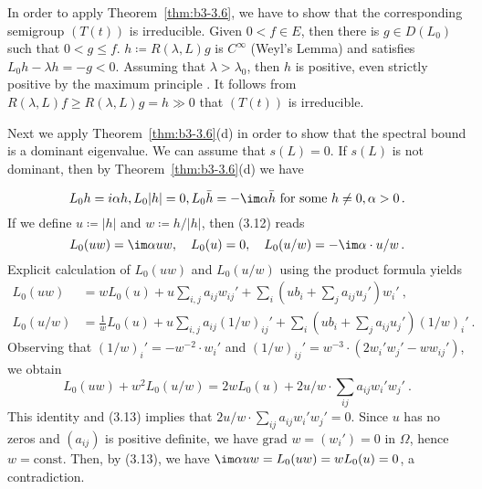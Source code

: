 \begin{examples}
\begin{enumerate}[(a), wide]
	In order to apply Theorem~\ref{thm:b3-3.6}, we have to show that the corresponding semigroup $(T(t))$ is irreducible.
	Given $0 < f \in E$, then there is $g \in D(L_{0})$ such that $0 < g \leq f$.
	$h \coloneq R(\lambda,L)g$ is $C^{\infty}$ (Weyl's Lemma) and satisfies $L_{0}h - \lambda h = -g < 0$.
	Assuming that $\lambda > \lambda_{0}$, then $h$ is positive, even strictly positive by the maximum principle \citet[Chap.2, Theorem~6]{protterweinberger:1967}.
	It follows from $R(\lambda,L)f \geq R(\lambda,L)g = h \gg 0$ that $(T(t))$ is irreducible.
	
	Next we apply Theorem~\ref{thm:b3-3.6}(d) in order to show that the spectral bound is a dominant eigenvalue.
	We can assume that $s(L) = 0$.
	If $s(L)$ is not dominant, then by Theorem~\ref{thm:b3-3.6}(d) we have
	
	\begin{equation}\label{eq:b3-3.12}
		L_0h = i \alpha h, L_0|h| = 0, L_0\bar{h} = -\im\alpha \bar{h} 
		\text{ for some } h \ne 0, \alpha > 0\,.
	\end{equation}
%
%
	If we define $u \coloneq |h|$ and $w \coloneq h/|h|$, then (3.12) reads
	 \begin{equation}\label{eq:b3-3.13}
	L_{0}(uw) = \im\alpha uw, \quad L_{0}(u) = 0, \quad L_{0}(u/w) = -\im\alpha\cdot u/w \,.
	\end{equation}
	Explicit calculation of $L_{0}(uw)$ and $L_{0}(u/w)$ using the product formula yields
		\begin{equation}\label{eq:b3-3.14}
		\begin{split}
		L_{0}(uw) &=  wL_{0}(u) + u\sum_{i,j} a_{ij}w_{ij}' + \sum_{i}\left(ub_{i} + \sum_{j} a_{ij}u_{j}'\right)w_{i}'~,\\
		L_{0}(u/w) &= \frac{1}{w}L_{0}(u) + u\sum_{i,j}a_{ij}(1/w)_{ij}' + \sum_{i}\left(ub_{i} + \sum_{j} a_{ij}u_{j}'\right)(1/w)_{i}'~.
		\end{split}
	\end{equation}
	Observing that $(1/w)_{i}' = -w^{-2}\cdot w_{i}'$ and $(1/w)_{ij}' = w^{-3}\cdot(2w_{i}'w_{j}' - ww_{ij}')$, we obtain
		\begin{equation}\label{eq:b3-3.15}
			L_{0}(uw) + w^{2}L_{0}(u/w) = 2wL_{0}(u) + 2u/w\cdot\sum_{ij} a_{ij}w_{i}'w_{j}'~.
		\end{equation}
	This identity and (3.13) implies that $2u/w\cdot\sum_{ij} a_{ij}w_{i}'w_{j}' = 0$.
	Since $u$ has no zeros and $(a_{ij})$ is positive definite, we have $\text{grad } w = (w_{i}') = 0$ in $\Omega$, hence $w = \text{const}$.
	Then, by (3.13), we have $\im \alpha uw = L_{0}(uw) = wL_{0}(u) = 0$, a contradiction.


\end{enumerate}
\end{examples}
